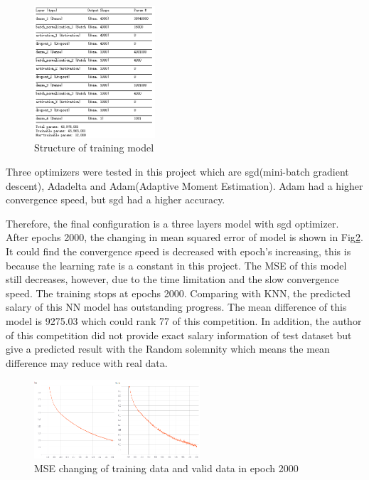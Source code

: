 \documentclass[12pt,journal,nofonttune]{IEEEtran}
\begin{document}
\begin{figure}[htbp]
    \centering
    \includegraphics[width=0.4\textwidth]{model.png}
    \caption{\label{model}Structure of training model}
\end{figure}

Three optimizers were tested in this project which are sgd(mini-batch gradient descent), Adadelta and Adam(Adaptive Moment Estimation). Adam had a higher convergence speed, but sgd had a higher accuracy. 

Therefore, the final configuration is a three layers model with sgd optimizer. After epochs 2000, the changing in mean squared error of model is shown in Fig\ref{loss}. It could find the convergence speed is decreased with epoch’s increasing, this is because the learning rate is a constant in this project. The MSE of this model still decreases, however, due to the time limitation and the slow convergence speed. The training stops at epochs 2000. Comparing with KNN, the predicted salary of this NN model has outstanding progress. The mean difference of this model is 9275.03 which could rank 77 of this competition. In addition, the author of this competition did not provide exact salary information of test dataset but give a predicted result with the Random solemnity which means the mean difference may reduce with real data.


\begin{figure}[htbp]
    \centering
    \includegraphics[width=0.55\textwidth]{loss.png}
    \caption{\label{loss}MSE changing of training data and valid data in epoch 2000}
\end{figure}




\end{document}

